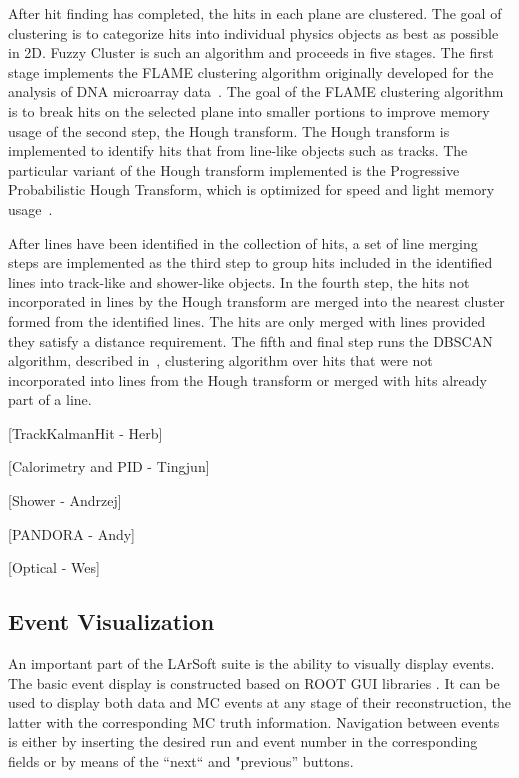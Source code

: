 \documentclass[12pt]{elsarticle}
\begin{document}
After hit finding has completed, the hits in each plane are clustered. The goal of clustering is to categorize hits into individual physics objects as best as possible in 2D. Fuzzy Cluster is such an algorithm and proceeds in five stages. The first stage implements the FLAME clustering algorithm originally developed for the analysis of DNA microarray data~\cite{flame}. The goal of the FLAME clustering algorithm is to break hits on the selected plane into smaller portions to improve memory usage of the second step, the Hough transform. The Hough transform is implemented to identify hits that from line-like objects such as tracks. The particular variant of the Hough transform implemented is the Progressive Probabilistic Hough Transform, which is optimized for speed and light memory usage~\cite{ppht}. 

After lines have been identified in the collection of hits, a set of line merging steps are implemented as the third step to group hits included in the identified lines into track-like and shower-like objects. In the fourth step, the hits not incorporated in lines by the Hough transform are merged into the nearest cluster formed from the identified lines. The hits are only merged with lines provided they satisfy a distance requirement. The fifth and final step runs the DBSCAN algorithm, described in~\cite{dbscan}, clustering algorithm over hits that were not incorporated into lines from the Hough transform or merged with hits already part of a line. 

[TrackKalmanHit - Herb]

[Calorimetry and PID - Tingjun]

[Shower - Andrzej]

[PANDORA - Andy]

[Optical - Wes]

\subsection{Event Visualization}
An important part of the LArSoft suite is the ability to visually display events. The basic event display is constructed based on ROOT GUI libraries \cite{ROOT}.
It can be used to display both data and MC events at any stage of their reconstruction, the latter with the corresponding MC truth information. 
Navigation between events is either by inserting the desired run and event number in the corresponding fields or by means of the ``next`` and "previous'' buttons.
\end{document}
